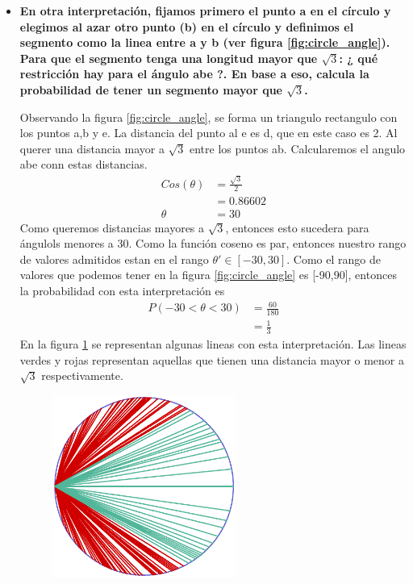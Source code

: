 \begin{itemize}
    \item \textbf{En otra interpretación, fijamos primero el punto a en el círculo y elegimos al azar otro punto (b) en el círculo y definimos el segmento como la linea entre a y b (ver figura \ref{fig:circle_angle}). Para que el segmento tenga una longitud mayor que $\sqrt{3}$: ¿ qué restricción hay para el ángulo abe ?. En base a eso, calcula la probabilidad de tener un segmento mayor que $\sqrt{3}$.}

          Observando la figura \ref{fig:circle_angle}, se forma un triangulo rectangulo con los puntos a,b y e. La distancia del punto al e es d, que en este caso es 2. Al querer una distancia mayor a $\sqrt{3}$ entre los puntos ab. Calcularemos el angulo abe conn estas distancias.
          \begin{align*}
              Cos(\theta) & = \frac{\sqrt{3}}{2} \\
                          & = 0.86602            \\
              \theta      & = 30
          \end{align*}
          Como queremos distancias mayores a $\sqrt{3}$, entonces esto sucedera para ángulols menores a $30$. Como la función coseno es par, entonces nuestro rango de valores admitidos estan en el rango $\theta' \in[-30,30]$. Como el rango de valores que podemos tener en la figura \ref{fig:circle_angle} es [-90,90], entonces la probabilidad con esta interpretación es
          \begin{align*}
              P(-30<\theta<30) & = \frac{60}{180} \\
                               & = \frac{1}{3}
          \end{align*}
          En la figura \ref{fig:problema2_interpretacion2} se representan algunas lineas con esta interpretación. Las lineas verdes y rojas representan aquellas que tienen una distancia mayor o menor a $\sqrt{3}$ respectivamente.
          \begin{figure}[H]
              \centering
              \includegraphics[width=6cm]{Graphics/circle_4.eps}
              \caption{}
              \label{fig:problema2_interpretacion2}
          \end{figure}
\end{itemize}
